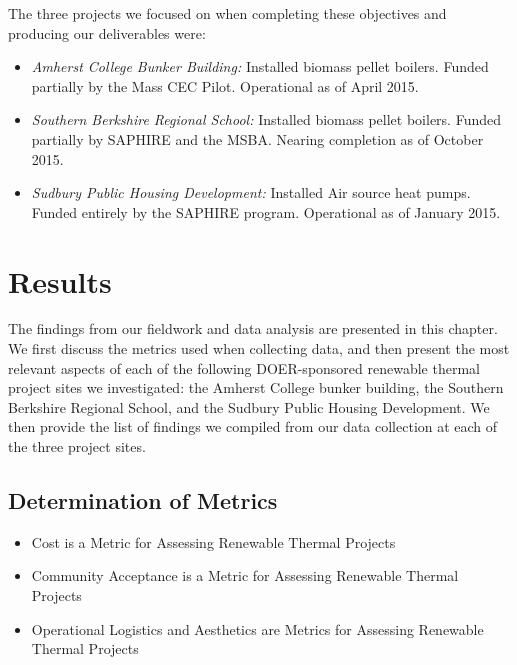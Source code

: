 \noindent
The three projects we focused on when completing these objectives and producing our deliverables were:
\begin{itemize}
  \item{\emph{Amherst College Bunker Building:} Installed biomass pellet boilers. Funded partially by the Mass CEC Pilot. Operational as of April 2015.}
  \item{\emph{Southern Berkshire Regional School:} Installed biomass pellet boilers. Funded partially by SAPHIRE and the MSBA. Nearing completion as of October 2015.}
  \item{\emph{Sudbury Public Housing Development:} Installed Air source heat pumps. Funded entirely by the SAPHIRE program. Operational as of January 2015.}
\end{itemize}

\section*{Results}
\par The findings from our fieldwork and data analysis are presented in this chapter. We first discuss the metrics used when collecting data, and then present the most relevant aspects of each of the following DOER-sponsored renewable thermal project sites we investigated: the Amherst College bunker building, the Southern Berkshire Regional School, and the Sudbury Public Housing Development. We then provide the list of findings we compiled from our data collection at each of the three project sites.
  \subsection*{Determination of Metrics}
  \begin{itemize}
    \item{Cost is a Metric for Assessing Renewable Thermal Projects}
    \item{Community Acceptance is a Metric for Assessing Renewable Thermal Projects}
    \item{Operational Logistics and Aesthetics are Metrics for Assessing Renewable Thermal Projects}
  \end{itemize}
